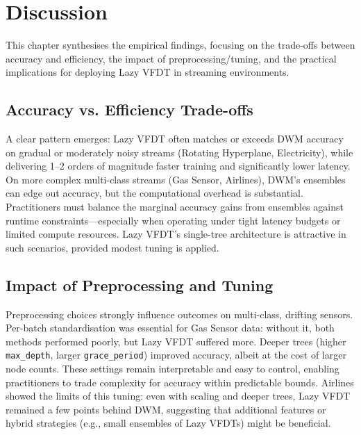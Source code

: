\cleardoublepage
\chapter{Discussion}
\label{chap:discussion}

This chapter synthesises the empirical findings, focusing on the trade-offs between accuracy and efficiency, the impact of preprocessing/tuning, and the practical implications for deploying Lazy VFDT in streaming environments.

\section{Accuracy vs. Efficiency Trade-offs}
A clear pattern emerges: Lazy VFDT often matches or exceeds DWM accuracy on gradual or moderately noisy streams (Rotating Hyperplane, Electricity), while delivering 1--2 orders of magnitude faster training and significantly lower latency. On more complex multi-class streams (Gas Sensor, Airlines), DWM's ensembles can edge out accuracy, but the computational overhead is substantial. Practitioners must balance the marginal accuracy gains from ensembles against runtime constraints---especially when operating under tight latency budgets or limited compute resources. Lazy VFDT's single-tree architecture is attractive in such scenarios, provided modest tuning is applied.

\section{Impact of Preprocessing and Tuning}
Preprocessing choices strongly influence outcomes on multi-class, drifting sensors. Per-batch standardisation was essential for Gas Sensor data: without it, both methods performed poorly, but Lazy VFDT suffered more. Deeper trees (higher \texttt{max\_depth}, larger \texttt{grace\_period}) improved accuracy, albeit at the cost of larger node counts. These settings remain interpretable and easy to control, enabling practitioners to trade complexity for accuracy within predictable bounds. Airlines showed the limits of this tuning: even with scaling and deeper trees, Lazy VFDT remained a few points behind DWM, suggesting that additional features or hybrid strategies (e.g., small ensembles of Lazy VFDTs) might be beneficial.

